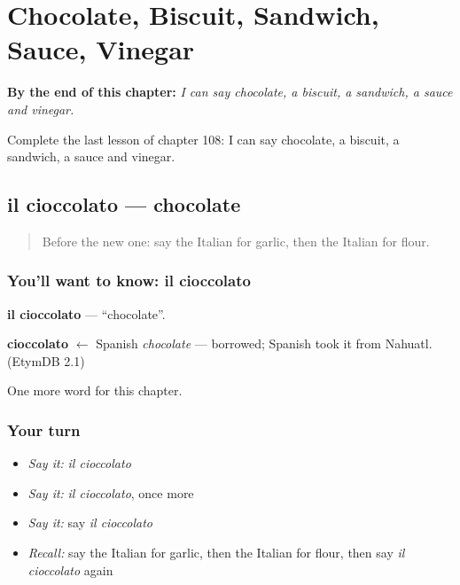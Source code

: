 
\chapter{Chocolate, Biscuit, Sandwich, Sauce, Vinegar}
\label{ch:it-chocolate-biscuit-sandwich-sauce-vinegar}

\begin{chapteropening}
\textbf{By the end of this chapter:} \emph{I can say chocolate, a biscuit, a sandwich, a sauce and vinegar.}

Complete the last lesson of chapter 108: I can say chocolate, a biscuit, a sandwich, a sauce and vinegar.
\end{chapteropening}

\section[il cioccolato]{il cioccolato — chocolate}

\label{lesson:IT-C108-cioccolato}



\begin{quote}
Before the new one: say the Italian for garlic, then the Italian for flour.
\end{quote}

\subsection*{You'll want to know: il cioccolato}
\textbf{il cioccolato} — \textquotedblleft{}chocolate\textquotedblright{}.

\begin{cousinweb}
\textbf{cioccolato} $\leftarrow$ Spanish \emph{chocolate} — borrowed; Spanish took it from Nahuatl. (EtymDB 2.1)
\end{cousinweb}

\begin{grammarlens}[title={What you've built}]
One more word for this chapter.
\end{grammarlens}

\subsection*{Your turn}
\begin{itemize}
\raggedright
  \item \emph{Say it:} \emph{il cioccolato}
  \item \emph{Say it:} \emph{il cioccolato}, once more
  \item \emph{Say it:} say \emph{il cioccolato}
  \item \emph{Recall:} say the Italian for garlic, then the Italian for flour, then say \emph{il cioccolato} again
\end{itemize}

